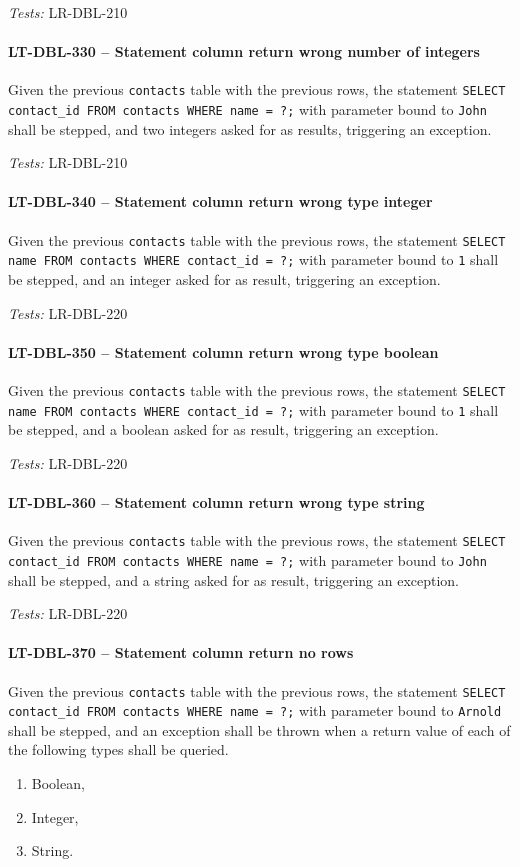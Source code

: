 \textit{Tests: } LR-DBL-210

\paragraph{LT-DBL-330 -- Statement column return wrong number of integers}
Given the previous \lstinline{contacts} table with the previous rows,
the statement
\lstinline{SELECT contact_id FROM contacts WHERE name = ?;}
with parameter bound to \lstinline{John} shall be stepped,
and two integers asked for as results, triggering an exception.

\textit{Tests: } LR-DBL-210

\paragraph{LT-DBL-340 -- Statement column return wrong type integer}
Given the previous \lstinline{contacts} table with the previous rows,
the statement
\lstinline{SELECT name FROM contacts WHERE contact_id = ?;}
with parameter bound to \lstinline{1} shall be stepped,
and an integer asked for as result, triggering an exception.

\textit{Tests: } LR-DBL-220

\paragraph{LT-DBL-350 -- Statement column return wrong type boolean}
Given the previous \lstinline{contacts} table with the previous rows,
the statement
\lstinline{SELECT name FROM contacts WHERE contact_id = ?;}
with parameter bound to \lstinline{1} shall be stepped,
and a boolean asked for as result, triggering an exception.

\textit{Tests: } LR-DBL-220

\paragraph{LT-DBL-360 -- Statement column return wrong type string}
Given the previous \lstinline{contacts} table with the previous rows,
the statement
\lstinline{SELECT contact_id FROM contacts WHERE name = ?;}
with parameter bound to \lstinline{John} shall be stepped,
and a string asked for as result, triggering an exception.

\textit{Tests: } LR-DBL-220

\paragraph{LT-DBL-370 -- Statement column return no rows}
Given the previous \lstinline{contacts} table with the previous rows,
the statement
\lstinline{SELECT contact_id FROM contacts WHERE name = ?;}
with parameter bound to \lstinline{Arnold} shall be stepped,
and an exception shall be thrown when a return value of each of
the following types shall be queried.
\begin{enumerate}
\item Boolean,
\item Integer,
\item String.
\end{enumerate}

